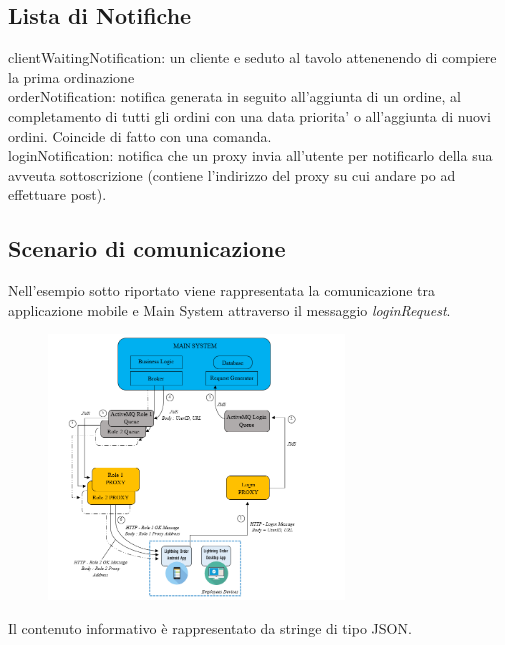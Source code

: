 \subsection{Lista di Notifiche}
clientWaitingNotification: un cliente e seduto al tavolo attenenendo di compiere la prima ordinazione
\\orderNotification: notifica generata in seguito all'aggiunta di un ordine, al completamento di tutti gli ordini con una data priorita' o all'aggiunta di nuovi ordini. Coincide di fatto con una comanda.
\\loginNotification: notifica che un proxy invia all'utente per notificarlo della sua avveuta sottoscrizione (contiene l'indirizzo del proxy su cui andare po ad effettuare post).

\subsection{Scenario di comunicazione}
Nell'esempio sotto riportato viene rappresentata la comunicazione tra applicazione mobile e Main System attraverso il messaggio \textit{loginRequest}.
\begin{figure}[H]
	\centering
	\includegraphics[width=0.7\textwidth]{Immagini/loginScenario.png}
\end{figure}
Il contenuto informativo è rappresentato da stringe di tipo JSON.
